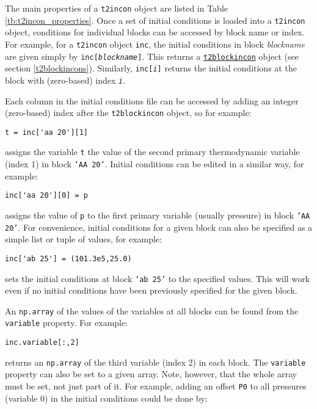 The main properties of a \texttt{t2incon} object are listed in Table \ref{tb:t2incon_properties}.  Once a set of initial conditions is loaded into a \texttt{t2incon} object, conditions for individual blocks can be accessed by block name or index.  For example, for a \texttt{t2incon} object \texttt{inc}, the initial conditions in block \emph{blockname} are given simply by \texttt{inc[\emph{blockname}]}.  This returns a \hyperref[t2blockincons]{\texttt{t2blockincon}} object (see section \ref{t2blockincons}).  Similarly, \texttt{inc[\emph{i}]} returns the initial conditions at the block with (zero-based) index \texttt{\emph{i}}.

Each column in the initial conditions file can be accessed by adding an integer (zero-based) index after the \texttt{t2blockincon} object, so for example:

\begin{lstlisting}
t = inc['aa 20'][1]
\end{lstlisting}

assigns the variable \texttt{t} the value of the second primary thermodynamic variable (index 1) in block \texttt{'AA 20'}.  Initial conditions can be edited in a similar way, for example:

\begin{lstlisting}
inc['aa 20'][0] = p
\end{lstlisting}

assigns the value of \texttt{p} to the first primary variable (usually pressure) in block \texttt{'AA 20'}.  For convenience, initial conditions for a given block can also be specified as a simple list or tuple of values, for example:

\begin{lstlisting}
inc['ab 25'] = (101.3e5,25.0)
\end{lstlisting}

sets the initial conditions at block \texttt{'ab 25'} to the specified values.  This will work even if no initial conditions have been previously specified for the given block.

An \texttt{np.array} of the values of the variables at all blocks can be found from the \texttt{variable} property.  For example:

\begin{lstlisting}
inc.variable[:,2]
\end{lstlisting}

returns an \texttt{np.array} of the third variable (index 2) in each block.  The \texttt{variable} property can also be set to a given array.  Note, however, that the whole array must be set, not just part of it.  For example, adding an offset \texttt{P0} to all pressures (variable 0) in the initial conditions could be done by:

